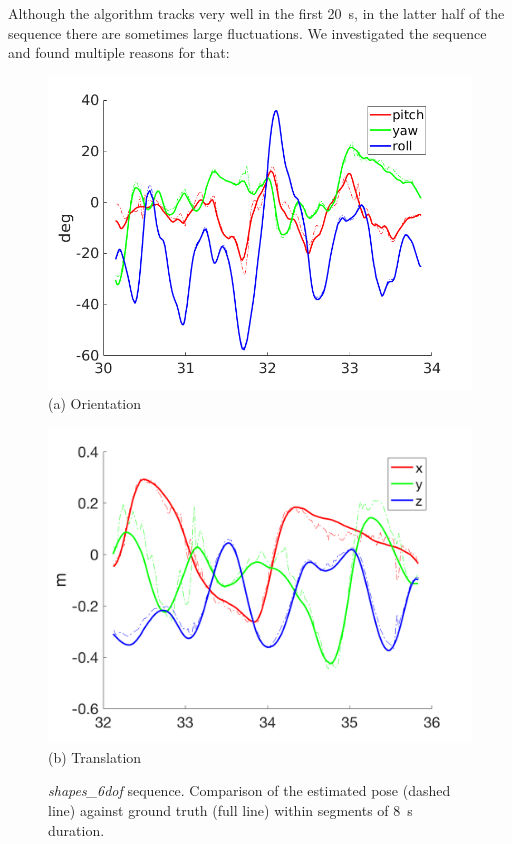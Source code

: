 Although the algorithm tracks very well in the first \SI{20}{\second},
in the latter half of the sequence there are sometimes large
fluctuations. We investigated the sequence and found multiple reasons
for that:
\begin{figure}[H]
  \begin{minipage}[t]{0.48\textwidth}
    \centering \includegraphics[width =
    \textwidth]{images/shapes_6dof_rotation_33.png} (a) Orientation
  \end{minipage}
  \hfill
  \begin{minipage}[t]{0.48\textwidth}
    \centering \includegraphics[width =
    \textwidth]{images/shapes_6dof_translation_33.png} (b) Translation
  \end{minipage}
  \hfill
  \caption{\textit{shapes\_6dof} sequence. Comparison of the estimated
    pose (dashed line) against ground truth (full line) within
    segments of \SI{8}{\second} duration.}
  \label{fig:shapes_6dof_pose_zoomed}
\end{figure}

